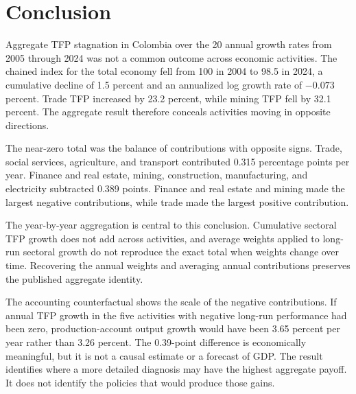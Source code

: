 \section{Conclusion}

Aggregate TFP stagnation in Colombia over the 20 annual growth rates from 2005 through 2024 was not a common outcome across economic activities. The chained index for the total economy fell from 100 in 2004 to 98.5 in 2024, a cumulative decline of 1.5 percent and an annualized log growth rate of $-0.073$ percent. Trade TFP increased by 23.2 percent, while mining TFP fell by 32.1 percent. The aggregate result therefore conceals activities moving in opposite directions.

The near-zero total was the balance of contributions with opposite signs. Trade, social services, agriculture, and transport contributed 0.315 percentage points per year. Finance and real estate, mining, construction, manufacturing, and electricity subtracted 0.389 points. Finance and real estate and mining made the largest negative contributions, while trade made the largest positive contribution.

The year-by-year aggregation is central to this conclusion. Cumulative sectoral TFP growth does not add across activities, and average weights applied to long-run sectoral growth do not reproduce the exact total when weights change over time. Recovering the annual weights and averaging annual contributions preserves the published aggregate identity.

The accounting counterfactual shows the scale of the negative contributions. If annual TFP growth in the five activities with negative long-run performance had been zero, production-account output growth would have been 3.65 percent per year rather than 3.26 percent. The 0.39-point difference is economically meaningful, but it is not a causal estimate or a forecast of GDP. The result identifies where a more detailed diagnosis may have the highest aggregate payoff. It does not identify the policies that would produce those gains.
